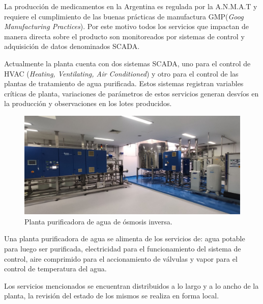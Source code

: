 La producción de medicamentos en la Argentina es regulada por la A.N.M.A.T y requiere el cumplimiento de las buenas prácticas de manufactura GMP(\emph{Goog Manufacturing Practices}). Por este motivo todos los servicios que impactan de manera directa sobre el producto son monitoreados por sistemas de control y adquisición de datos denominados SCADA.

Actualmente la planta cuenta con dos sistemas SCADA, uno para el control de HVAC (\emph{Heating, Ventilating, Air Conditioned}) y otro para el control de las plantas de tratamiento de agua purificada. Estos sistemas registran variables críticas de planta, variaciones de parámetros de estos servicios generan desvíos en la producción y observaciones en los lotes producidos.

\begin{figure}[htbp]
	\centering
	\includegraphics[width=1\textwidth]{./Figures/PWNB.png}
	\caption{Planta purificadora de agua de ósmosis inversa.}
	\label{fig:texmaker}
\end{figure}

Una planta purificadora de agua se alimenta de los servicios de: agua potable para luego ser purificada, electricidad para el funcionamiento del sistema de control, aire comprimido para el accionamiento de válvulas y vapor para el control de temperatura del agua.

Los servicios mencionados se encuentran distribuidos a lo largo y a lo ancho de la planta, la revisión del estado de los mismos se realiza en forma local.


